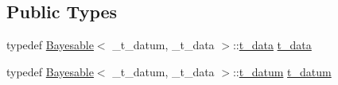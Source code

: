 \subsection*{Public Types}
\begin{DoxyCompactItemize}
\item 
typedef \hyperlink{class_bayesable}{Bayesable}$<$ \+\_\+t\+\_\+datum, \+\_\+t\+\_\+data $>$\+::\hyperlink{class_l_o_t_hypothesis_a3a7b2c5fb3e2b5d70fa80b485b0b98f5}{t\+\_\+data} \hyperlink{class_l_o_t_hypothesis_a3a7b2c5fb3e2b5d70fa80b485b0b98f5}{t\+\_\+data}
\item 
typedef \hyperlink{class_bayesable}{Bayesable}$<$ \+\_\+t\+\_\+datum, \+\_\+t\+\_\+data $>$\+::\hyperlink{class_l_o_t_hypothesis_a26d0ecfa6a367f32276d36cd01c0cead}{t\+\_\+datum} \hyperlink{class_l_o_t_hypothesis_a26d0ecfa6a367f32276d36cd01c0cead}{t\+\_\+datum}
\end{DoxyCompactItemize}
